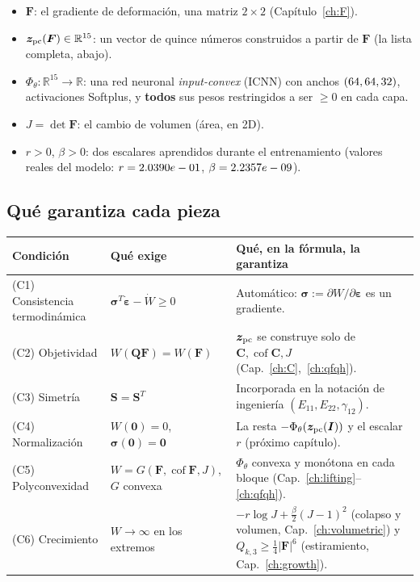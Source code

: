 \documentclass[11pt,a4paper]{article}
\newcommand{\Cof}{\operatorname{cof}}
\newcommand{\R}{\mathbb{R}}
\begin{document}
\begin{itemize}
\item $\bm F$: el gradiente de deformaci\'on, una matriz $2\times2$
(Cap\'itulo~\ref{ch:F}).
\item $\bm z_{\rm pc}(\bm F)\in\R^{15}$: un vector de quince n\'umeros
construidos a partir de $\bm F$ (la lista completa, abajo).
\item $\Phi_\theta:\R^{15}\to\R$: una red neuronal \emph{input-convex}
(ICNN) con anchos $(64,64,32{})$, activaciones Softplus, y
\textbf{todos} sus pesos restringidos a ser $\geq0$ en cada capa.
\item $J=\det\bm F$: el cambio de volumen (\'area, en 2D).
\item $r>0$, $\beta>0$: dos escalares aprendidos durante el
entrenamiento (valores reales del modelo:
$r=2.0390e-01{}$, $\beta=2.2357e-09{}$).
\end{itemize}

\subsection*{Qu\'e garantiza cada pieza}

\begin{center}
\small
\begin{tabular}{@{}p{3.3cm}p{3.9cm}p{8.2cm}@{}}
\toprule
Condici\'on & Qu\'e exige & Qu\'e, en la f\'ormula, la garantiza\\
\midrule
(C1) Consistencia termodin\'amica & $\bm\sigma^T\dot{\bm\varepsilon}-\dot W\geq0$ & Autom\'atico: $\bm\sigma:=\partial W/\partial\bm\varepsilon$ es un gradiente.\\
(C2) Objetividad & $W(\bm Q\bm F)=W(\bm F)$ & $\bm z_{\rm pc}$ se construye solo de $\bm C,\Cof\bm C,J$ (Cap.~\ref{ch:C},~\ref{ch:qfqh}).\\
(C3) Simetr\'ia & $\bm S=\bm S^T$ & Incorporada en la notaci\'on de ingenier\'ia $(E_{11},E_{22},\gamma_{12})$.\\
(C4) Normalizaci\'on & $W(\bm 0)=0$, $\bm\sigma(\bm 0)=\bm 0$ & La resta $-\Phi_\theta(\bm z_{\rm pc}(\bm I))$ y el escalar $r$ (pr\'oximo cap\'itulo).\\
(C5) Polyconvexidad & $W=G(\bm F,\Cof\bm F,J)$, $G$ convexa & $\Phi_\theta$ convexa y mon\'otona en cada bloque (Cap.~\ref{ch:lifting}--\ref{ch:qfqh}).\\
(C6) Crecimiento & $W\to\infty$ en los extremos & $-r\log J+\tfrac\beta2(J-1)^2$ (colapso y volumen, Cap.~\ref{ch:volumetric}) y $Q_{k,3}\geq\tfrac14|\bm F|^6$ (estiramiento, Cap.~\ref{ch:growth}).\\
\bottomrule
\end{tabular}
\end{center}
\end{document}
